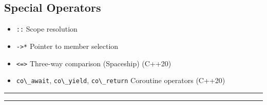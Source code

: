 \hypertarget{special-operators}{%
\subsection{Special Operators}\label{special-operators}}

\begin{itemize}
\tightlist
\item
  \passthrough{\lstinline!::!} Scope resolution
\item
  \passthrough{\lstinline!->*!} Pointer to member selection
\item
  \passthrough{\lstinline!<=>!} Three-way comparison (Spaceship) (C++20)
\item
  \passthrough{\lstinline!co\_await!},
  \passthrough{\lstinline!co\_yield!},
  \passthrough{\lstinline!co\_return!} Coroutine operators (C++20)
\end{itemize}

\begin{center}\rule{0.5\linewidth}{0.5pt}\end{center}

\begin{center}\rule{0.5\linewidth}{0.5pt}\end{center}
